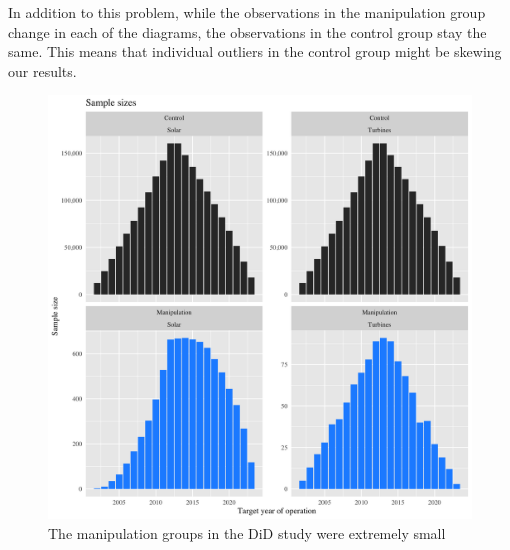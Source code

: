 \documentclass{article}
\begin{document}
In addition to this problem, while the observations in the manipulation group change in each of the diagrams, the observations in the control group stay the same.
This means that individual outliers in the control group might be skewing our results.
\begin{figure}[h]
\centering
\includegraphics[width=0.9\linewidth]
{study1_sample_size.png} 
\caption{The manipulation groups in the DiD study were extremely small}
\label{study1samplesize}
\end{figure}
\end{document}
